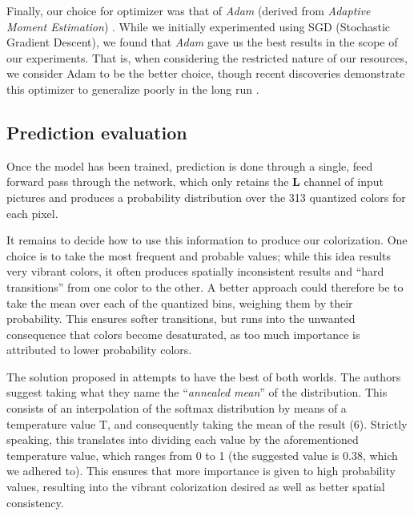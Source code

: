 \documentclass[twoside,twocolumn]{article}
\begin{document}
Finally, our choice for optimizer was that of \textit{Adam} (derived from \textit{Adaptive Moment Estimation}) \cite{Diaderik:2015}. While we initially experimented using SGD (Stochastic Gradient Descent), we found that \textit{Adam} gave us the best results in the scope of our experiments. That is, when considering the restricted nature of our resources, we consider Adam to be the better choice, though recent discoveries demonstrate this optimizer to generalize poorly in the long run \cite{Nitish:2017}.


\subsection{Prediction evaluation}

Once the model has been trained, prediction is done through a single, feed forward pass through the network, which only retains the \textbf{L} channel of input pictures and produces a probability distribution over the 313 quantized colors for each pixel.

It remains to decide how to use this information to produce our colorization. One choice is to take the most frequent and probable values; while this idea results very vibrant colors, it often produces spatially inconsistent results and “hard transitions” from one color to the other. A better approach could therefore be to take the mean over each of the quantized bins, weighing them by their probability. This ensures softer transitions, but runs into the unwanted consequence that colors become desaturated, as too much importance is attributed to lower probability colors.

The solution proposed in \cite{Zhang:2016} attempts to have the best of both worlds. The authors suggest taking what they name the “\textit{annealed mean}” of the distribution. This consists of an interpolation of the softmax distribution by means of a temperature value T, and consequently taking the mean of the result (6). Strictly speaking, this translates into dividing each value by the aforementioned temperature value, which ranges from 0 to 1 (the suggested value is 0.38, which we adhered to). This ensures that more importance is given to high probability values, resulting into the vibrant colorization desired as well as better spatial consistency.

\end{document}
